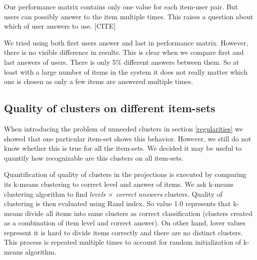 \documentclass[
  digital, %
  table,   %
  nolof,     %
  nolot,     %
  nocover
]{fithesis3}
\begin{document}

Our performance matrix contains only one value for each item-user pair. But users can possibly answer to the item multiple times. This raises a question about which of user answers to use. [CITE]


We tried using both first users answer and last in performance matrix. However, there is no visible difference in results. This is clear when we compare first and last answers of users. There is only 5\% different answers between them. So at least with a large number of items in the system it does not really matter which one is chosen as only a few items are answered multiple times.

\subsection{Quality of clusters on different item-sets}\label{quality-of-clusters}

When introducing the problem of unneeded clusters in section \ref{regularities} we showed that one particular item-set shows this behavior. However, we still do not know whether this is true for all the item-sets. We decided it may be useful to quantify how recognizable are this clusters on all item-sets.


Quantification of quality of clusters in the projections is executed by comparing its k-means clustering to correct level and answer of items. We ask k-means clustering algorithm to find \textit{levels $\times$ correct answers} clusters. Quality of clustering is then evaluated using Rand index. So value 1.0 represents that k-means divide all items into same clusters as correct classification (clusters created as a combination of item level and correct answer). On other hand, lover values represent it is hard to divide items correctly and there are no distinct clusters. This process is repeated multiple times to account for random initialization of k-means algorithm.
\end{document}
